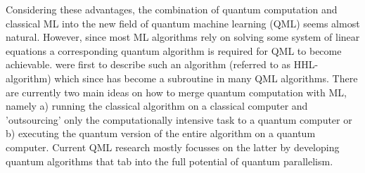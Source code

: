 \documentclass[a4paper]{article}
\newcommand*{\0}{$\ket{0}$}
\newcommand*{\1}{$\ket{1}$}
\begin{document}

Considering these advantages, the combination of quantum computation and classical ML into the new field of quantum machine learning (QML) seems almost natural. However, since most ML algorithms rely on solving some system of linear equations a corresponding quantum algorithm is required for QML to become achievable. \cite{HHL2009} were first to describe such an algorithm (referred to as HHL-algorithm) which since has become a subroutine in many QML algorithms. There are currently two main ideas on how to merge quantum computation with ML, namely a) running the classical algorithm on a classical computer and 'outsourcing' only the computationally intensive task to a quantum computer or b) executing the quantum version of the entire algorithm on a quantum computer. Current QML research mostly focusses on the latter by developing quantum algorithms that tab into the full potential of quantum parallelism.






\end{document}
